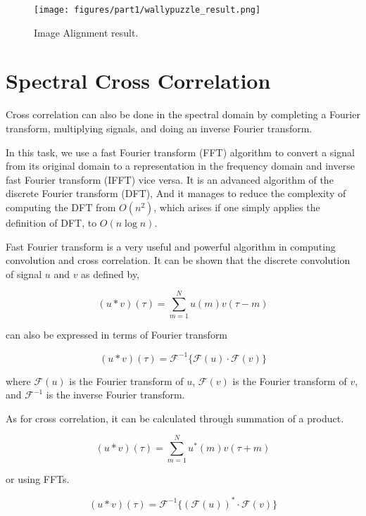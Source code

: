\begin{figure}[h!]
	\centering
		\texttt{[image: figures/part1/wallypuzzle\_result.png]}
		\caption{Image Alignment result. }
		\label{fig:maze-b}
\end{figure} 

\section{Spectral Cross Correlation}

Cross correlation can also be done in the spectral domain by completing a Fourier transform, multiplying signals, and doing an inverse Fourier transform.

In this task, we use a fast Fourier transform (FFT) algorithm to convert a signal from its original domain to a representation in the frequency domain and inverse fast Fourier transform (IFFT) vice versa. It is an advanced algorithm of the discrete Fourier transform (DFT), And it manages to reduce the complexity of computing the DFT from $O(n^2)$, which arises if one simply applies the definition of DFT, to $O(n\log n)$.

Fast Fourier transform is a very useful and powerful algorithm in computing convolution and cross correlation. It can be shown that the discrete convolution of signal $u$ and $v$ as defined by,

\begin{equation*}
(u*v)(\tau)=\sum_{m=1}^{N}u(m)v(\tau-m)
\end{equation*}

can also be expressed in terms of Fourier transform

\begin{equation*}
(u*v)(\tau)=\mathcal{F}^{-1}\{\mathcal{F}(u)\cdot \mathcal{F}(v)\}
\end{equation*}

where $\mathcal{F}(u)$ is the Fourier transform of $u$, $\mathcal{F}(v)$ is the Fourier transform of $v$, and $\mathcal{F}^{-1}$ is the inverse Fourier transform.

As for cross correlation, it can be calculated through summation of a product.

\begin{equation*}
(u*v)(\tau)=\sum_{m=1}^{N}u^*(m)v(\tau+m)
\end{equation*}

or using FFTs.

\begin{equation*}
	(u*v)(\tau)=\mathcal{F}^{-1}\{(\mathcal{F}(u))^{*}\cdot \mathcal{F}(v)\}
\end{equation*}

